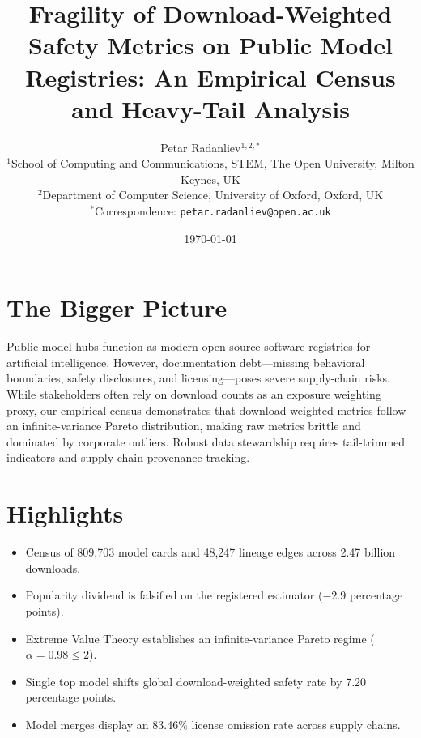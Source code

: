 \documentclass[11pt,letterpaper]{article}
\title{\textbf{Fragility of Download-Weighted Safety Metrics on Public Model Registries: An Empirical Census and Heavy-Tail Analysis}}
\author{
  Petar Radanliev$^{1,2,*}$\\[1ex]
  \small $^{1}$School of Computing and Communications, STEM, The Open University, Milton Keynes, UK\\
  \small $^{2}$Department of Computer Science, University of Oxford, Oxford, UK\\
  \small $^*$Correspondence: \texttt{petar.radanliev@open.ac.uk}
}
\date{\today}
\begin{document}
\maketitle

\section*{The Bigger Picture}
Public model hubs function as modern open-source software registries for artificial intelligence. However, documentation debt—missing behavioral boundaries, safety disclosures, and licensing—poses severe supply-chain risks. While stakeholders often rely on download counts as an exposure weighting proxy, our empirical census demonstrates that download-weighted metrics follow an infinite-variance Pareto distribution, making raw metrics brittle and dominated by corporate outliers. Robust data stewardship requires tail-trimmed indicators and supply-chain provenance tracking.

\section*{Highlights}
\begin{itemize}
  \item Census of 809,703 model cards and 48,247 lineage edges across 2.47 billion downloads.
  \item Popularity dividend is falsified on the registered estimator ($-2.9$ percentage points).
  \item Extreme Value Theory establishes an infinite-variance Pareto regime ($\alpha = 0.98 \le 2$).
  \item Single top model shifts global download-weighted safety rate by 7.20 percentage points.
  \item Model merges display an 83.46\% license omission rate across supply chains.
\end{itemize}
\end{document}
